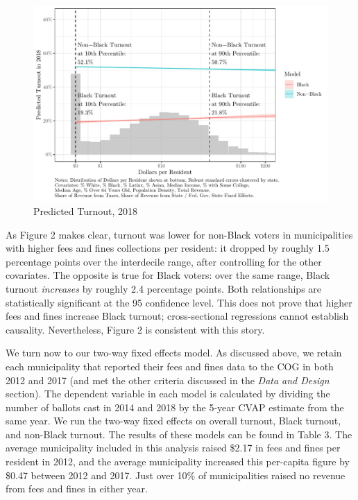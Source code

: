 \documentclass[
  12pt,
]{article}
\begin{document}
\begin{figure}[!htb]

{\centering \includegraphics{draft_paper_files/figure-latex/cross-18-1} 

}

\caption{\label{fig:mef-2018}Predicted Turnout, 2018}\label{fig:cross-18}
\end{figure}

As Figure 2 makes clear, turnout was lower for non-Black voters in municipalities with higher fees and fines collections per resident: it dropped by roughly 1.5 percentage points over the interdecile range, after controlling for the other covariates. The opposite is true for Black voters: over the same range, Black turnout \emph{increases} by roughly 2.4 percentage points. Both relationships are statistically significant at the 95 confidence level. This does not prove that higher fees and fines increase Black turnout; cross-sectional regressions cannot establish causality. Nevertheless, Figure 2 is consistent with this story.

We turn now to our two-way fixed effects model. As discussed above, we retain each municipality that reported their fees and fines data to the COG in both 2012 and 2017 (and met the other criteria discussed in the \emph{Data and Design} section). The dependent variable in each model is calculated by dividing the number of ballots cast in 2014 and 2018 by the 5-year CVAP estimate from the same year. We run the two-way fixed effects on overall turnout, Black turnout, and non-Black turnout. The results of these models can be found in Table 3. The average municipality included in this analysis raised \$2.17 in fees and fines per resident in 2012, and the average municipality increased this per-capita figure by \$0.47 between 2012 and 2017. Just over 10\% of municipalities raised no revenue from fees and fines in either year.
\end{document}
